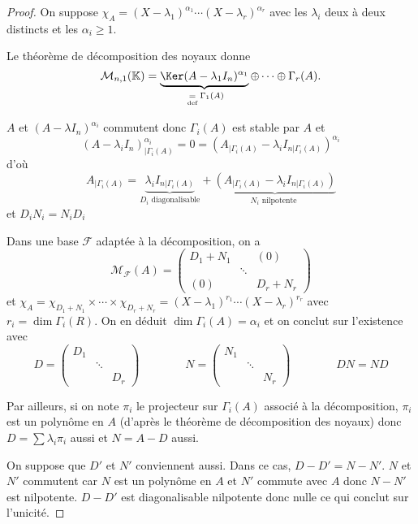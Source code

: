 \begin{proof}
    On suppose $\chi_A=(X-\lambda_1)^{\alpha_1}\cdots (X-\lambda_r)^{\alpha_r}$ avec les $\lambda_i$ deux à deux distincts et les $\alpha_i\geq 1$.

    Le théorème de décomposition des noyaux donne \[
        \mathcal M_{n, 1}(\mathbb K)=\underbrace{\Ker(A-\lambda_1I_n)^{\alpha_1}}_{\defeq \Gamma_1(A)}\oplus\cdots \oplus \Gamma_r(A).
    \]

    $A$ et $(A-\lambda I_n)^{\alpha_i}$ commutent donc $\Gamma_i(A)$ est stable par $A$ et \[
        (A-\lambda_i I_n)^{\alpha_i}_{|\Gamma_i(A)}=0=(A_{|\Gamma_i(A)}-\lambda_i I_{n|\Gamma_i(A)})^{\alpha_i}
    \]
    d'où \[
        A_{|\Gamma_i(A)}=\underbrace{\lambda_i I_{n|\Gamma_i(A)}}_{D_i \text{ diagonalisable}}+ \underbrace{\left(A_{|\Gamma_i(A)}-\lambda_i I_{n|\Gamma_i(A)}  \right)}_{N_i\text{ nilpotente }}
    \]
    et $D_iN_i=N_iD_i$

    Dans une base $\mathcal F$ adaptée à la décomposition, on a \[
        \mathcal M_{\mathcal F}(A)= \begin{pmatrix}
            D_1+N_1 & & (0)\\
                    &\ddots &\\
            (0)&&D_r+N_r
        \end{pmatrix}
    \]
    et $\chi_A=\chi_{D_1+N_1}\times \cdots \times \chi_{D_r+N_r}=(X-\lambda_1)^{r_1}\cdots (X-\lambda_r)^{r_r}$ avec $r_i=\dim\Gamma_i(R)$. On en déduit $\dim\Gamma_i(A)=\alpha_i$ et on conclut sur l'existence avec \[
        D= \begin{pmatrix}
            D_1 & & \\
                &\ddots &\\
                &&D_r
        \end{pmatrix}
        \qquad \qquad N= \begin{pmatrix}
            N_1&&\\
               &\ddots&\\
               &&N_r
        \end{pmatrix}
        \qquad \qquad DN=ND
    \]

    Par ailleurs, si on note $\pi_i$ le projecteur sur $\Gamma_i(A)$ associé à la décomposition, $\pi_i$ est un polynôme en $A$ (d'après le théorème de décomposition des noyaux) donc $D=\sum \lambda_i\pi_i$ aussi et $N=A-D$ aussi.

    On suppose que $D'$ et $N'$ conviennent aussi. Dans ce cas, $D-D'=N-N'$. $N$ et $N'$ commutent car $N$ est un polynôme en $A$ et $N'$ commute avec $A$ donc $N-N'$ est nilpotente. $D-D'$ est diagonalisable nilpotente donc nulle ce qui conclut sur l'unicité.
\end{proof}

